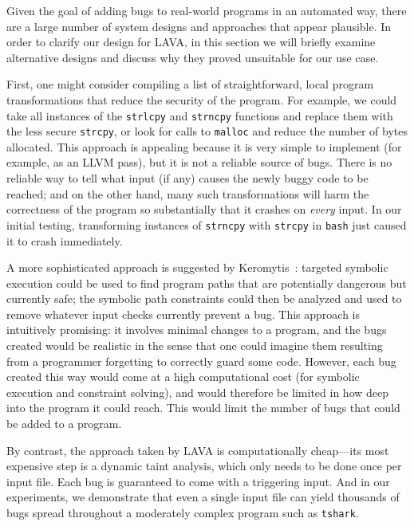Given the goal of adding bugs to real-world programs in an automated
way, there are a large number of system designs and approaches that
appear plausible. In order to clarify our design for LAVA, in this
section we will briefly examine alternative designs and discuss why they
proved unsuitable for our use case.

First, one might consider compiling a list of straightforward, local
program transformations that reduce the security of the program. For
example, we could take all instances of the \texttt{strlcpy} and
\texttt{strncpy} functions and replace them with the less secure
\texttt{strcpy}, or look for calls to \texttt{malloc} and reduce the
number of bytes allocated. This approach is appealing because it is very
simple to implement (for example, as an LLVM pass), but it is not a
reliable source of bugs. There is no reliable way to tell what input (if
any) causes the newly buggy code to be reached; and on the other hand,
many such transformations will harm the correctness of the program so
substantially that it crashes on \emph{every} input. In our initial
testing, transforming instances of \texttt{strncpy} with \texttt{strcpy}
in \texttt{bash} just caused it to crash immediately.

A more sophisticated approach is suggested by Keromytis~\cite{}:
targeted symbolic execution could be used to find program paths that are
potentially dangerous but currently safe; the symbolic path constraints
could then be analyzed and used to remove whatever input checks
currently prevent a bug. This approach is intuitively promising: it
involves minimal changes to a program, and the bugs created would be
realistic in the sense that one could imagine them resulting from a
programmer forgetting to correctly guard some code. However, each bug
created this way would come at a high computational cost (for symbolic
execution and constraint solving), and would therefore be limited in how
deep into the program it could reach. This would limit the number of
bugs that could be added to a program.

By contrast, the approach taken by LAVA is computationally cheap---its
most expensive step is a dynamic taint analysis, which only needs to be
done once per input file. Each bug is guaranteed to come with a
triggering input. And in our experiments, we demonstrate that even a
single input file can yield thousands of bugs spread throughout a
moderately complex program such as \texttt{tshark}.
